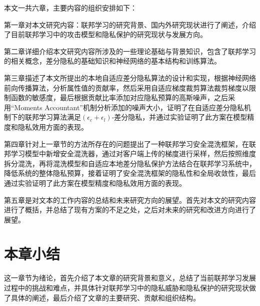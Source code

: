 本文一共六章，主要内容的组织安排如下：

第一章对本文研究内容：联邦学习的研究背景、国内外研究现状进行了阐述，介绍了目前联邦学习中的攻击模型和隐私保护的研究现状与发展方向。

第二章详细介绍本文研究内容所涉及的一些理论基础与背景知识，包含了联邦学习的相关概念，差分隐私的基础知识和神经网络的基本结构和训练算法。

第三章描述了本文所提出的本地自适应差分隐私算法的设计和实现，根据神经网络前向传播算法，分析属性值的贡献率，然后采用自适应梯度裁剪算法裁剪梯度以限制函数的敏感度，最后根据贡献比率添加对应隐私预算的高斯噪声，之后采用“Moments Accountant”机制分析添加的噪声大小，证明了在自适应差分隐私机制下的联邦学习算法满足$\left(\epsilon_{c}+\epsilon_{l}\right)$-差分隐私，并通过实验证明了此方案在模型精度和隐私效用方面的表现。
  
第四章针对上一章节的方法所存在的问题提出了一种联邦学习安全混洗框架，在联邦学习模型中新增安全混洗器，通过对客户端上传的梯度进行采样，然后按照维度拆分混洗，再将混洗模型和自适应本地差分隐私保护方法结合在联邦学习系统中，降低系统的整体隐私预算，接着证明了安全混洗框架的隐私性和全局收敛性，最后通过实验证明了此方案在模型精度和隐私效用方面的表现。

第五章是对文本的工作内容的总结和未来研究方向的展望。首先对本文的研究内容进行了概括，并总结了现有方案的不足之处，之后对未来的研究和改进方向进行了展望。

\section{本章小结}
这一章节为绪论，首先介绍了本文章的研究背景和意义，总结了当前联邦学习发展过程中的挑战和难点，并具体针对联邦学习中的隐私威胁和隐私保护的研究现状做了具体的阐述，最后介绍了文章的主要研究、贡献和组织结构。

